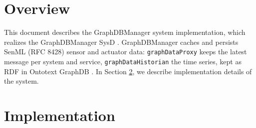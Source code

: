 \documentclass[a4paper]{arrowhead}
\begin{document}
\sloppy

\ArrowheadSetup

\begin{center}
  \vspace*{1cm}
  \huge{\arrowtitle}

  \vspace*{0.2cm}
  \LARGE{\arrowtype}
  \vspace*{1cm}

  \vspace*{\fill}


  \vspace*{1cm}
  \vspace*{\fill}

  \begin{abstract}
    This document describes the design and implementation of the GraphDBManager support system of Arrowhead 5.2.2 (\texttt{ah5-GraphDBManager-java-spring}).
  \end{abstract}

  \vspace*{1cm}
\end{center}

\newpage

\tableofcontents
\newpage

\section{Overview}
\label{sec:overview}

This document describes the GraphDBManager system implementation, which realizes the GraphDBManager SysD \cite{gdm-sysd}. GraphDBManager caches and persists SenML (RFC 8428) sensor and actuator data: \texttt{graphDataProxy} keeps the latest message per system and service, \texttt{graphDataHistorian} the time series, kept as RDF in Ontotext GraphDB \cite{graphdb}.
In Section \ref{Implementation}, we describe implementation details of the system.

\newpage

\section{Implementation}
\label{Implementation}
\end{document}
